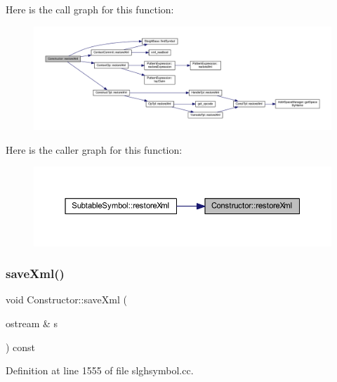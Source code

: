 Here is the call graph for this function\+:
\nopagebreak
\begin{figure}[H]
\begin{center}
\leavevmode
\includegraphics[width=350pt]{class_constructor_a67b635e452e41499c9962aaad9406781_cgraph}
\end{center}
\end{figure}
Here is the caller graph for this function\+:
\nopagebreak
\begin{figure}[H]
\begin{center}
\leavevmode
\includegraphics[width=350pt]{class_constructor_a67b635e452e41499c9962aaad9406781_icgraph}
\end{center}
\end{figure}
\mbox{\label{class_constructor_a13e55da521f225ca03ce3237b9879e71}} 
\subsubsection{\texorpdfstring{saveXml()}{saveXml()}}
{\footnotesize\ttfamily void Constructor\+::save\+Xml (\begin{DoxyParamCaption}\item[{ostream \&}]{s }\end{DoxyParamCaption}) const}



Definition at line 1555 of file slghsymbol.\+cc.

